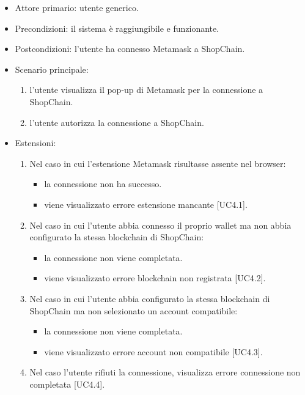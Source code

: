 \begin{itemize}
    \item Attore primario: utente generico.
    \item Precondizioni: il sistema è raggiungibile e funzionante.
    \item Postcondizioni: l'utente ha connesso Metamask a ShopChain.
    \item Scenario principale: \begin{enumerate}
        \item l'utente visualizza il pop-up di Metamask per la connessione a ShopChain.
        \item l'utente autorizza la connessione a ShopChain.
    \end{enumerate}
    \item Estensioni: \begin{enumerate}
        \item Nel caso in cui l'estensione Metamask risultasse assente nel browser: \begin{itemize}
            \item la connessione non ha successo.
            \item viene visualizzato errore estensione mancante [UC4.1].
        \end{itemize}
        \item Nel caso in cui l'utente abbia connesso il proprio wallet ma non abbia configurato la stessa blockchain di ShopChain: \begin{itemize}
            \item la connessione non viene completata.
            \item viene visualizzato errore blockchain non registrata [UC4.2].
        \end{itemize}
        \item Nel caso in cui l'utente abbia configurato la stessa blockchain di ShopChain ma non selezionato un account compatibile: \begin{itemize}
            \item la connessione non viene completata.
            \item viene visualizzato errore account non compatibile [UC4.3].
        \end{itemize}
        \item Nel caso l'utente rifiuti la connessione, visualizza errore connessione non completata [UC4.4].
    \end{enumerate}
\end{itemize}

